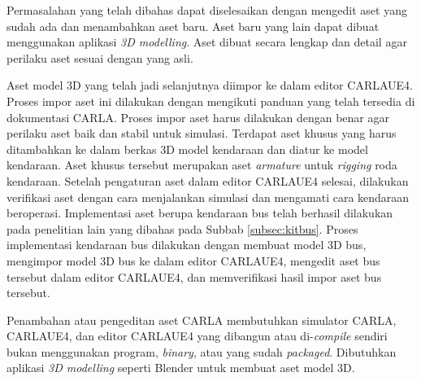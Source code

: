 Permasalahan yang telah dibahas dapat diselesaikan dengan mengedit aset yang
sudah ada dan menambahkan aset baru. Aset baru yang lain dapat dibuat
menggunakan aplikasi \textit{3D modelling}. Aset dibuat secara lengkap dan
detail agar perilaku aset sesuai dengan yang asli.


Aset model 3D yang telah jadi selanjutnya diimpor ke dalam editor CARLAUE4.
Proses impor aset ini dilakukan dengan mengikuti panduan yang telah tersedia di
dokumentasi CARLA. Proses impor aset harus dilakukan dengan benar agar perilaku
aset baik dan stabil untuk simulasi. Terdapat aset khusus yang harus ditambahkan
ke dalam berkas 3D model kendaraan dan diatur ke model kendaraan. Aset khusus
tersebut merupakan aset \textit{armature} untuk \textit{rigging} roda kendaraan.
Setelah pengaturan aset dalam editor CARLAUE4 selesai, dilakukan verifikasi aset
dengan cara menjalankan simulasi dan mengamati cara kendaraan beroperasi.
Implementasi aset berupa kendaraan bus telah berhasil dilakukan pada penelitian
lain yang dibahas pada Subbab \ref{subsec:kitbus}. Proses implementasi kendaraan
bus dilakukan dengan membuat model 3D bus, mengimpor model 3D bus ke dalam
editor CARLAUE4, mengedit aset bus tersebut dalam editor CARLAUE4, dan
memverifikasi hasil impor aset bus tersebut.



Penambahan atau pengeditan aset CARLA membutuhkan simulator CARLA, CARLAUE4, dan
editor CARLAUE4 yang dibangun atau di-\textit{compile} sendiri bukan menggunakan
program, \textit{binary}, atau yang sudah \textit{packaged}. Dibutuhkan aplikasi
\textit{3D modelling} seperti Blender untuk membuat aset model 3D.

